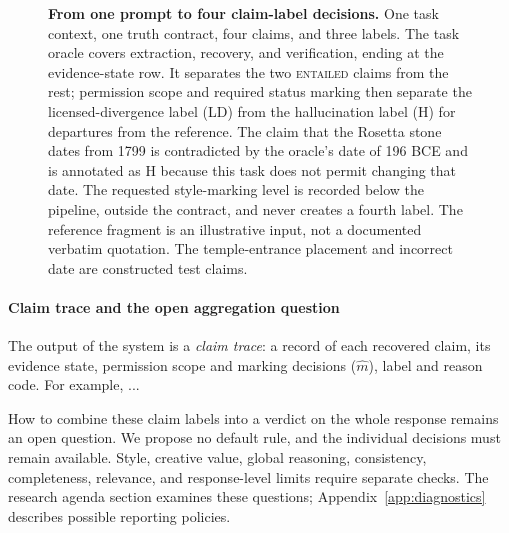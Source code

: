 \documentclass{clv2025}
\newcommand{\LD}{\textsc{LD}}
\newcommand{\Hall}{\textsc{H}}
\begin{document}
\begin{figure}[!t]
{}
\caption{\textbf{From one prompt to four claim-label decisions.}
One task context, one truth contract, four claims, and three labels. The task
oracle covers extraction, recovery, and verification, ending at the evidence-state
row. It separates the two \textsc{entailed} claims
from the rest; permission scope and required status marking then separate the
licensed-divergence label (\LD) from the hallucination label (\Hall) for
departures from the reference. The claim that the Rosetta stone dates from
1799 is contradicted by the oracle's date of 196 BCE and is annotated as \Hall{}
because this task does not permit changing that date. The requested style-marking level is
recorded below the pipeline,
outside the contract, and never creates a fourth label. The reference fragment is an illustrative input, not a documented verbatim quotation. The temple-entrance placement and incorrect date are constructed test claims.}
\label{fig:claim-label-annotation}
\end{figure}
\FloatBarrier

\paragraph{Claim trace and the open aggregation question}\label{subsec:response}

The output of the system is a \emph{claim trace}: a record of each recovered claim, its
evidence state, permission scope and marking decisions ($\widehat{m}$), label and reason code. For example, ...


How to combine these claim labels into a verdict on the whole response remains an
open question. We propose no default rule, and the individual decisions must remain
available. Style, creative value, global reasoning, consistency, completeness,
relevance, and response-level limits require separate checks. The research
agenda section examines these questions; Appendix~\ref{app:diagnostics} describes
possible reporting policies.
\end{document}
